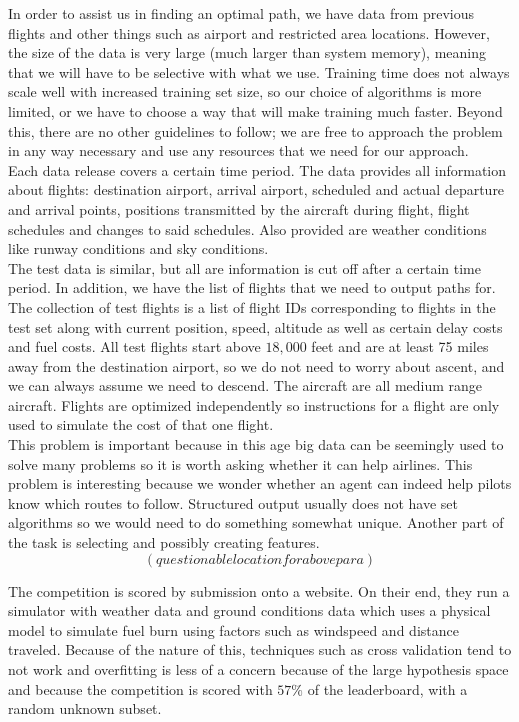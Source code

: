 \documentclass{article}[12pt]
\begin{document}
\begin{multicols}{2}
In order to assist us in finding an optimal path, we have data from previous flights and other things such as airport and restricted area locations. However, the size of the data is very large (much larger than system memory), meaning that we will have to be selective with what we use. Training time does not always scale well with increased training set size, so our choice of algorithms is more limited, or we have to choose a way that will make training much faster. Beyond this, there are no other guidelines to follow; we are free to approach the problem in any way necessary and use any resources that we need for our approach. \\
Each data release covers a certain time period. The data provides all information about flights: destination airport, arrival airport, scheduled and actual departure and arrival points, positions transmitted by the aircraft during flight, flight schedules and changes to said schedules. Also provided are weather conditions like runway conditions and sky conditions. \\
The test data is similar, but all are information is cut off after a certain time period. In addition, we have the list of flights that we need to output paths for. The collection of test flights is a list of flight IDs corresponding to flights in the test set along with current position, speed, altitude as well as certain delay costs and fuel costs. All test flights start above $18,000$ feet and are at least 75 miles away from the destination airport, so we do not need to worry about ascent, and we can always assume we need to descend. The aircraft are all medium range aircraft. Flights are optimized independently so instructions for a flight are only used to simulate the cost of that one flight. \\
This problem is important because in this age big data can be seemingly used to solve many problems so it is worth asking whether it can help airlines. This problem is interesting because we wonder whether an agent can indeed help pilots know which routes to follow. Structured output usually does not have set algorithms so we would need to do something somewhat unique. Another part of the task is selecting and possibly creating features.  $$(questionable location for above para)$$

The competition is scored by submission onto a website. On their end, they run a simulator with weather data and ground conditions data which uses a physical model to simulate fuel burn using factors such as windspeed and distance traveled. Because of the nature of this, techniques such as cross validation tend to not work and overfitting is less of a concern because of the large hypothesis space and because the competition is scored with $57\%$ of the leaderboard, with a random unknown subset.

\end{multicols}
\end{document}
